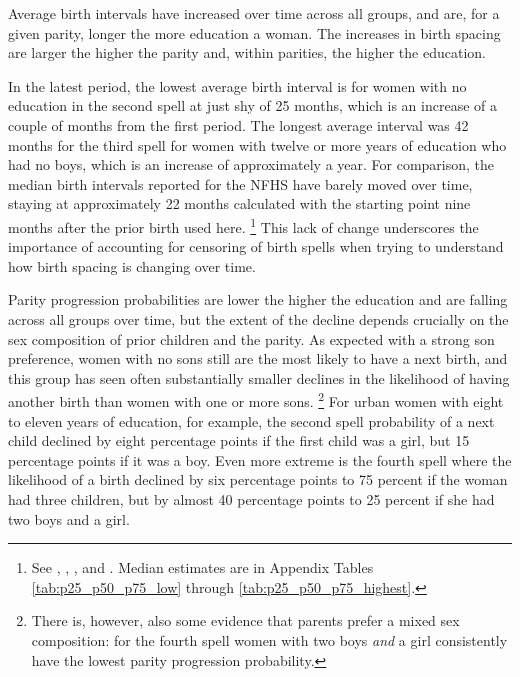 \documentclass[12pt,letterpaper]{article}
\begin{document}
Average birth intervals have increased over time across all groups, and are, for a given 
parity, longer the more education a woman.
The increases in birth spacing are larger the higher the parity
and, within parities, the higher the education.

In the latest period, the lowest average birth interval is for women with no 
education in the second spell at just shy of 25 months, which is an increase of a
couple of months from the first period.
The longest average interval was 42 months for the third spell for women with twelve or 
more years of education who had no boys, which is an increase of approximately a year.
For comparison, the median birth intervals reported for the NFHS have barely
moved over time, staying at approximately 22 months calculated with the starting point 
nine months after the prior birth used here.%
\footnote{
See
\citet[][p.\ 110--112]{International-Institute-for-Population-Sciences-IIPS1995},
\citet[][p.\ 98--103]{International-Institute-for-Population-Sciences-IIPS2000},
\citet[][p.\ 88--91]{International-Institute-for-Population-Sciences-IIPS2007}, and
\citet[][p.\ 81--82]{International-Institute-for-Population-Sciences-IIPS2017}.
Median estimates are in
Appendix Tables \ref{tab:p25_p50_p75_low} through \ref{tab:p25_p50_p75_highest}.
}
This lack of change underscores the importance of accounting for censoring of birth spells 
when trying to understand how birth spacing is changing over time.

Parity progression probabilities are lower the higher the education and are
falling across all groups over time, but the extent of the decline depends crucially on 
the sex composition of prior children and the parity.
As expected with a strong son preference, women with no sons still are the most likely to 
have a next birth, and this group has seen often substantially smaller declines in
the likelihood of having another birth than women with one or more sons.%
\footnote{
There is, however, also some evidence that parents prefer a mixed sex composition: for 
the fourth spell women with two boys \emph{and} a girl
consistently have the lowest parity progression probability.
}
For urban women with eight to eleven years of education, for example, the second spell
probability of a next child declined by eight percentage points if the first child was a 
girl, but 15 percentage points if it was a boy.
Even more extreme is the fourth spell where the likelihood of a birth declined by six 
percentage points to 75 percent if the woman had three children, but by almost 40 
percentage points to 25 percent if she had two boys and a girl.
\end{document}
